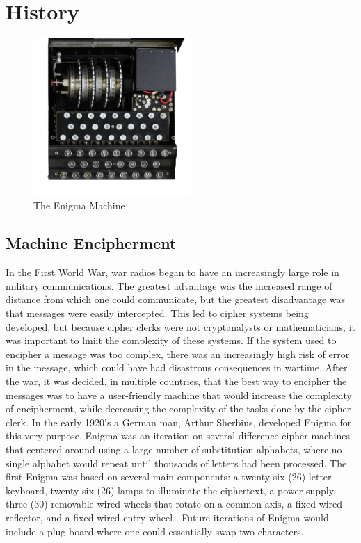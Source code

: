 \chapter{History}\label{chap:history}

\begin{figure}[h!]
\begin{centering}
  \includegraphics[height=6cm]{images/enigma.jpg}
  \caption{The Enigma Machine}
  \label{fig:machine1}
\end{centering}
\end{figure}

\section{Machine Encipherment}
In the First World War, war radios began to have an increasingly large role in military communications. The greatest advantage was the increased range of distance from which one could communicate, but the greatest disadvantage was that messages were easily intercepted. This led to cipher systems being developed, but because cipher clerks were not cryptanalysts or mathematicians, it was important to lmiit the complexity of these systems. If the system used to encipher a message was too complex, there was an increasingly high risk of error in the message, which could have had disastrous consequences in wartime. After the war, it was decided, in multiple countries, that the best way to encipher the messages was to have a user-friendly machine that would increase the complexity of encipherment, while decreasing the complexity of the tasks done by the cipher clerk. In the early 1920’s a German man, Arthur Sherbius, developed Enigma for this very purpose. Enigma was an iteration on several difference cipher machines that centered around using a large number of substitution alphabets, where no single alphabet would repeat until thousands of letters had been processed. The first Enigma was based on several main components: a twenty-six (26) letter keyboard, twenty-six (26) lamps to illuminate the ciphertext, a power supply, three (30) removable wired wheels that rotate on a common axis, a fixed wired reflector, and a fixed wired entry wheel \cite{rfc01}. Future iterations of Enigma would include a plug board where one could essentially swap two characters.

